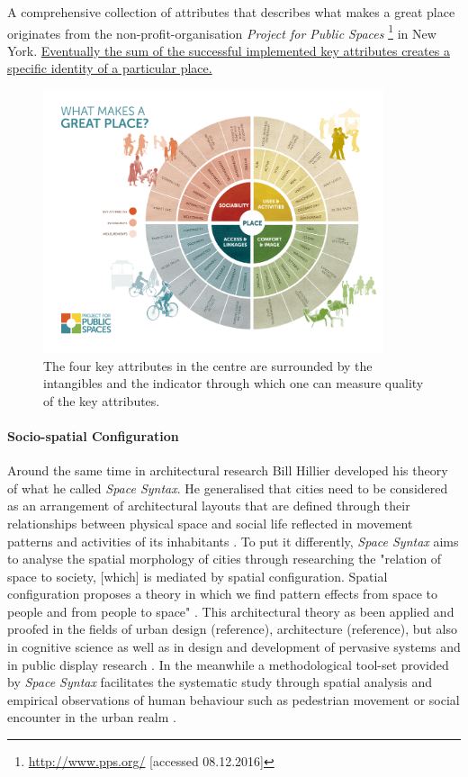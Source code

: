 A comprehensive collection of attributes that describes what makes a great place originates from the non-profit-organisation \textit{Project for Public Spaces} \footnote{\url{http://www.pps.org/} [accessed 08.12.2016]}  in New York. 
\hyperref[placemaking]{Eventually the sum of the successful implemented key attributes creates a specific identity of a particular place.}  

\begin{figure}[h] 
\centering
\includegraphics[width=10cm]{Illustrations/great_place.png}
\caption [What makes a great place?] {The four key attributes in the centre are surrounded by the intangibles and the indicator through which one can measure quality of the key attributes.}
\label{great_place}
\end{figure}

\paragraph{Socio-spatial Configuration}
Around the same time in architectural research Bill Hillier developed his theory of what he called \textit{Space Syntax}. He generalised that cities need to be considered as an arrangement of architectural layouts that are defined through their relationships between physical space and social life reflected in movement patterns and activities of its inhabitants \cite{Hillier_1989}. 
To put it differently, \textit{Space Syntax}  aims to analyse the spatial morphology of cities through researching the "relation of space to society, [which] is mediated by spatial configuration. Spatial configuration proposes a theory in which we find pattern effects from space to people and from people to space" \cite{Hillier_1998}. This architectural theory as been applied and proofed in the fields of urban design (reference), architecture (reference), but also in cognitive science \cite{Hoelscher_2006} as well as in design and development of pervasive systems \cite{Kostakos_2010} and in public display research \cite{Dalton_2010}. In the meanwhile a methodological tool-set provided by \textit{Space Syntax} facilitates the systematic study through spatial analysis and empirical observations of human behaviour such as pedestrian movement or social encounter in the urban realm \cite{Al_Sayed_2013}.

